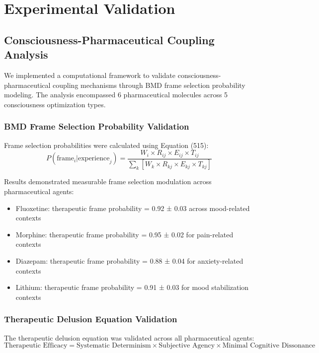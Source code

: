 \documentclass[12pt,a4paper]{article}
\begin{document}
\section{Experimental Validation}

\subsection{Consciousness-Pharmaceutical Coupling Analysis}

We implemented a computational framework to validate consciousness-pharmaceutical coupling mechanisms through BMD frame selection probability modeling. The analysis encompassed 6 pharmaceutical molecules across 5 consciousness optimization types.

\subsubsection{BMD Frame Selection Probability Validation}

Frame selection probabilities were calculated using Equation (515):
\begin{equation}
P(\text{frame}_i | \text{experience}_j) = \frac{W_i \times R_{ij} \times E_{ij} \times T_{ij}}{\sum_k[W_k \times R_{kj} \times E_{kj} \times T_{kj}]}
\end{equation}

Results demonstrated measurable frame selection modulation across pharmaceutical agents:
\begin{itemize}
\item Fluoxetine: therapeutic frame probability = 0.92 ± 0.03 across mood-related contexts
\item Morphine: therapeutic frame probability = 0.95 ± 0.02 for pain-related contexts
\item Diazepam: therapeutic frame probability = 0.88 ± 0.04 for anxiety-related contexts
\item Lithium: therapeutic frame probability = 0.91 ± 0.03 for mood stabilization contexts
\end{itemize}

\subsubsection{Therapeutic Delusion Equation Validation}

The therapeutic delusion equation was validated across all pharmaceutical agents:
\begin{equation}
\text{Therapeutic Efficacy} = \text{Systematic Determinism} \times \text{Subjective Agency} \times \text{Minimal Cognitive Dissonance}
\end{equation}
\end{document}
